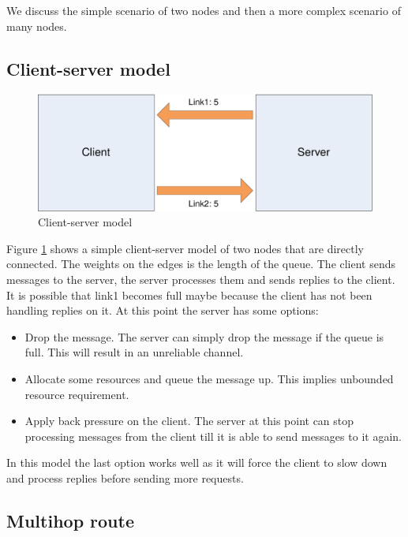 \documentclass[a4paper,twoside]{report} %
\begin{document}
We discuss the simple scenario of two nodes and
then a more complex scenario of many nodes.

\subsection{Client-server model}

\begin{figure}[t]
 \includegraphics[width=\columnwidth]{client-server.pdf}
 \caption{Client-server model}\label{fig:client-server}
\end{figure}

Figure \ref{fig:client-server} shows a simple client-server model
of two nodes that are directly connected.
The weights on the edges is the length of the queue.
The client sends messages to the server, the server processes them
and sends replies to the client.
It is possible that link1 becomes full maybe because
the client has not been handling replies on it.
At this point the server has some options:

\begin{itemize}
\item Drop the message.
  The server can simply drop the message if the queue is full.
  This will result in an unreliable channel.
\item Allocate some resources and queue the message up.
  This implies unbounded resource requirement.
\item Apply back pressure on the client.
  The server at this point can stop processing messages
  from the client till it is able to send messages to it again.
\end{itemize}

In this model the last option works well as it will force the client
to slow down and process replies before sending more requests.

\subsection{Multihop route}
\end{document}
